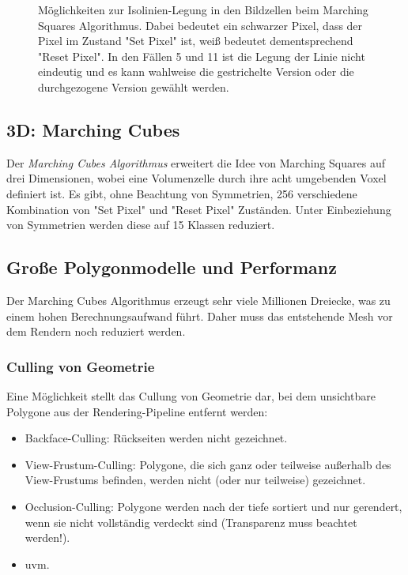\begin{figure}
				\caption{Möglichkeiten zur Isolinien-Legung in den Bildzellen beim Marching Squares Algorithmus. Dabei bedeutet ein schwarzer Pixel, dass der Pixel im Zustand "Set Pixel" ist, weiß bedeutet dementsprechend "Reset Pixel". In den Fällen \num{5} und \num{11} ist die Legung der Linie nicht eindeutig und es kann wahlweise die gestrichelte Version oder die durchgezogene Version gewählt werden.}
				\label{fig:marchingsquares}
			\end{figure}

		\subsection{3D: Marching Cubes}
			Der \emph{Marching Cubes Algorithmus} erweitert die Idee von Marching Squares auf drei Dimensionen, wobei eine Volumenzelle durch ihre acht umgebenden Voxel definiert ist. Es gibt, ohne Beachtung von Symmetrien, \num{256} verschiedene Kombination von "Set Pixel" und "Reset Pixel" Zuständen. Unter Einbeziehung von Symmetrien werden diese auf \num{15} Klassen reduziert.

		\subsection{Große Polygonmodelle und Performanz}
			Der Marching Cubes Algorithmus erzeugt sehr viele Millionen Dreiecke, was zu einem hohen Berechnungsaufwand führt. Daher muss das entstehende Mesh vor dem Rendern noch reduziert werden.

			\subsubsection{Culling von Geometrie}
				Eine Möglichkeit stellt das Cullung von Geometrie dar, bei dem unsichtbare Polygone aus der Rendering-Pipeline entfernt werden:
				\begin{itemize}
					\item Backface-Culling: Rückseiten werden nicht gezeichnet.
					\item View-Frustum-Culling: Polygone, die sich ganz oder teilweise außerhalb des View-Frustums befinden, werden nicht (oder nur teilweise) gezeichnet.
					\item Occlusion-Culling: Polygone werden nach der tiefe sortiert und nur gerendert, wenn sie nicht vollständig verdeckt sind (Transparenz muss beachtet werden!).
					\item uvm.
				\end{itemize}

